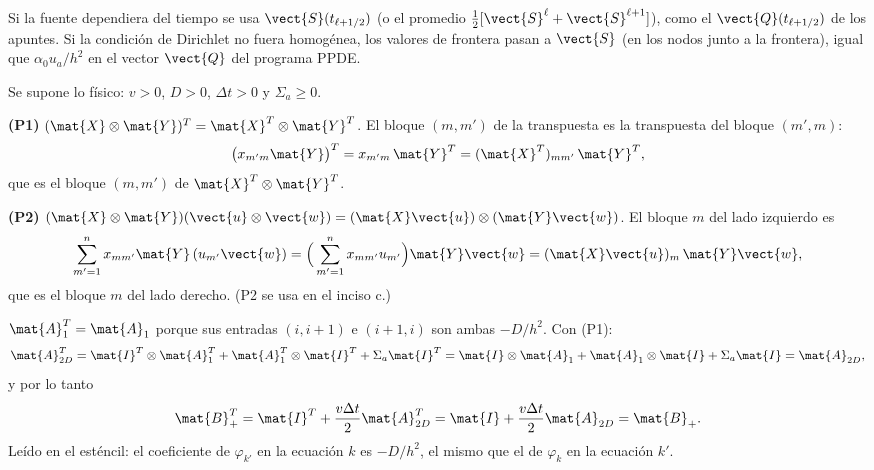 \begin{ojo}
Si la fuente dependiera del tiempo se usa $\vect{S}(t_{\ell+1/2})$ (o el promedio
$\frac12[\vect{S}^\ell + \vect{S}^{\ell+1}]$), como el $\vect{Q}(t_{\ell+1/2})$ de los apuntes. Si la condición
de Dirichlet no fuera homogénea, los valores de frontera pasan a $\vect{S}$ (en los nodos junto a la
frontera), igual que $\alpha_0 u_a/h^2$ en el vector $\vect{Q}$ del programa PPDE.
\end{ojo}

Se supone lo físico: $v > 0$, $D > 0$, $\Delta t > 0$ y $\Sigma_a \ge 0$.

\textbf{(P1)} $(\mat{X}\otimes\mat{Y})^T = \mat{X}^T\otimes\mat{Y}^T$. El bloque $(m, m')$ de la transpuesta es
la transpuesta del bloque $(m', m)$:
\[
  \big(x_{m'm}\mat{Y}\big)^T = x_{m'm}\,\mat{Y}^T = (\mat{X}^T)_{mm'}\,\mat{Y}^T,
\]
que es el bloque $(m, m')$ de $\mat{X}^T\otimes\mat{Y}^T$.

\textbf{(P2)} $(\mat{X}\otimes\mat{Y})(\vect{u}\otimes\vect{w}) = (\mat{X}\vect{u})\otimes(\mat{Y}\vect{w})$. El bloque $m$ del
lado izquierdo es
\[
  \sum_{m'=1}^{n} x_{mm'}\mat{Y}\,(u_{m'}\vect{w}) = \Big(\sum_{m'=1}^{n} x_{mm'}u_{m'}\Big)\mat{Y}\vect{w}
  = (\mat{X}\vect{u})_m\,\mat{Y}\vect{w},
\]
que es el bloque $m$ del lado derecho. (P2 se usa en el inciso c.)

$\mat{A}_1^T = \mat{A}_1$ porque sus entradas $(i, i+1)$ e $(i+1, i)$ son ambas $-D/h^2$. Con (P1):
\[
  \mat{A}_{2D}^T = \mat{I}^T\otimes\mat{A}_1^T + \mat{A}_1^T\otimes\mat{I}^T + \Sigma_a\mat{I}^T
  = \mat{I}\otimes\mat{A}_1 + \mat{A}_1\otimes\mat{I} + \Sigma_a\mat{I} = \mat{A}_{2D},
\]
y por lo tanto
\[
  \mat{B}_{+}^T = \mat{I}^T + \frac{v\Delta t}{2}\mat{A}_{2D}^T = \mat{I} + \frac{v\Delta t}{2}\mat{A}_{2D} = \mat{B}_{+}.
\]
Leído en el esténcil: el coeficiente de $\varphi_{k'}$ en la ecuación $k$ es $-D/h^2$, el mismo que el de
$\varphi_k$ en la ecuación $k'$.

